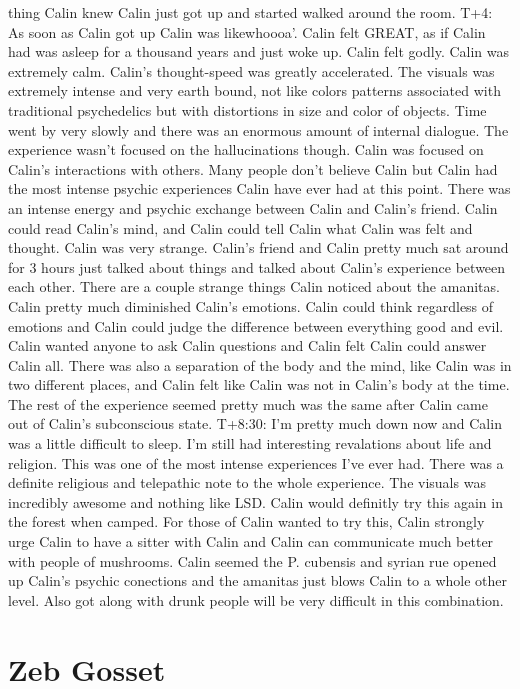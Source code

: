 \documentclass[12pt]{book}
\begin{document}
thing Calin knew Calin just got up and started walked around the room. T+4: As soon as Calin got up Calin was likewhoooa'. Calin felt GREAT, as if Calin had was asleep for a thousand years and just woke up. Calin felt godly. Calin was extremely calm. Calin's thought-speed was greatly accelerated. The visuals was extremely intense and very earth bound, not like colors patterns associated with traditional psychedelics but with distortions in size and color of objects. Time went by very slowly and there was an enormous amount of internal dialogue. The experience wasn't focused on the hallucinations though. Calin was focused on Calin's interactions with others. Many people don't believe Calin but Calin had the most intense psychic experiences Calin have ever had at this point. There was an intense energy and psychic exchange between Calin and Calin's friend. Calin could read Calin's mind, and Calin could tell Calin what Calin was felt and thought. Calin was very strange. Calin's friend and Calin pretty much sat around for 3 hours just talked about things and talked about Calin's experience between each other. There are a couple strange things Calin noticed about the amanitas. Calin pretty much diminished Calin's emotions. Calin could think regardless of emotions and Calin could judge the difference between everything good and evil. Calin wanted anyone to ask Calin questions and Calin felt Calin could answer Calin all. There was also a separation of the body and the mind, like Calin was in two different places, and Calin felt like Calin was not in Calin's body at the time. The rest of the experience seemed pretty much was the same after Calin came out of Calin's subconscious state. T+8:30: I'm pretty much down now and Calin was a little difficult to sleep. I'm still had interesting revalations about life and religion. This was one of the most intense experiences I've ever had. There was a definite religious and telepathic note to the whole experience. The visuals was incredibly awesome and nothing like LSD. Calin would definitly try this again in the forest when camped. For those of Calin wanted to try this, Calin strongly urge Calin to have a sitter with Calin and Calin can communicate much better with people of mushrooms. Calin seemed the P. cubensis and syrian rue opened up Calin's psychic conections and the amanitas just blows Calin to a whole other level. Also got along with drunk people will be very difficult in this combination.



\chapter{Zeb Gosset}
\end{document}
